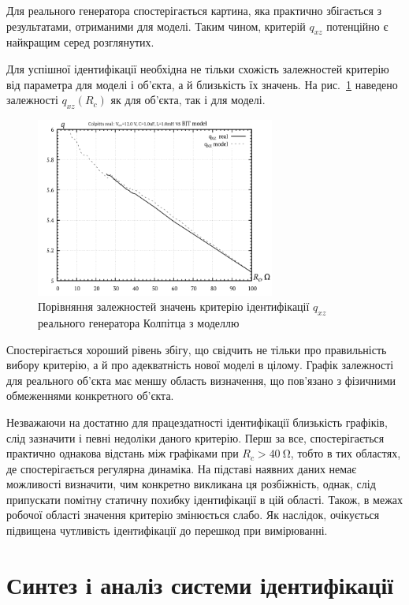 Для реального генератора спостерігається картина, яка практично
збігається з результатами, отриманими для моделі. Таким чином,
критерій $q_{xz}$ потенційно є найкращим серед розглянутих.

Для успішної ідентифікації необхідна не тільки схожість
залежностей критерію від параметра для моделі і об'єкта, а й
близькість їх значень. На рис.~\ref{atu:f:colp_q_cml} наведено залежності
$ q_{xz} (R_c) $ як для об'єкта, так і для моделі.

\begin{figure}[htb!]
\centerline{\includegraphics[width=0.7\textwidth]{p/colp_q_cml.png} }
\caption{Порівняння залежностей значень критерію ідентифікації $ q_{xz} $ реального генератора Колпітца з моделлю}
\label{atu:f:colp_q_cml}
\end{figure}

Спостерігається хороший рівень збігу, що свідчить не тільки
про правильність вибору критерію, а й про адекватність нової
моделі в цілому. Графік залежності для реального об'єкта має
меншу область визначення, що пов'язано з фізичними обмеженнями
конкретного об'єкта.

Незважаючи на достатню для працездатності ідентифікації
близькість графіків, слід зазначити і певні недоліки даного
критерію. Перш за все, спостерігається практично однакова
відстань між графіками при
$ R_c> \SI{40}{\ohm} $, тобто в тих областях, де спостерігається регулярна
динаміка. На підставі наявних даних немає можливості визначити,
чим конкретно викликана ця розбіжність, однак, слід припускати
помітну статичну похибку ідентифікації в цій області. Також, в
межах робочої області значення критерію змінюється слабо. Як
наслідок, очікується підвищена чутливість ідентифікації до
перешкод при вимірюванні.


\section{Синтез і аналіз системи ідентифікації} %


